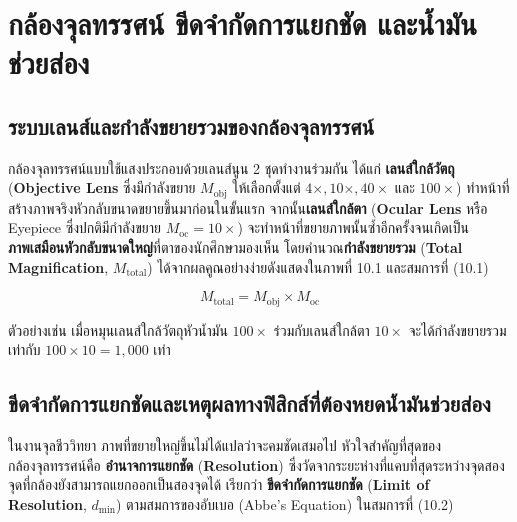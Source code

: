 \clearpage

\chapter{กล้องจุลทรรศน์ ขีดจำกัดการแยกชัด และน้ำมันช่วยส่อง}

\section{ระบบเลนส์และกำลังขยายรวมของกล้องจุลทรรศน์}


กล้องจุลทรรศน์แบบใช้แสงประกอบด้วยเลนส์นูน 2 ชุดทำงานร่วมกัน ได้แก่ \textbf{เลนส์ใกล้วัตถุ} (\textbf{Objective Lens} ซึ่งมีกำลังขยาย $M_{\text{obj}}$ ให้เลือกตั้งแต่ $4\times, 10\times, 40\times$ และ $100\times$) ทำหน้าที่สร้างภาพจริงหัวกลับขนาดขยายขึ้นมาก่อนในขั้นแรก จากนั้น\textbf{เลนส์ใกล้ตา} (\textbf{Ocular Lens} หรือ Eyepiece ซึ่งปกติมีกำลังขยาย $M_{\text{oc}} = 10\times$) จะทำหน้าที่ขยายภาพนั้นซ้ำอีกครั้งจนเกิดเป็น\textbf{ภาพเสมือนหัวกลับขนาดใหญ่}ที่ตาของนักศึกษามองเห็น โดยคำนวณ\textbf{กำลังขยายรวม} (\textbf{Total Magnification}, $M_{\text{total}}$) ได้จากผลคูณอย่างง่ายดังแสดงใน\mbox{ภาพที่} 10.1 และสมการที่ (10.1)

\begin{equation}
    M_{\text{total}} = M_{\text{obj}} \times M_{\text{oc}}
\end{equation}

ตัวอย่างเช่น เมื่อหมุนเลนส์ใกล้วัตถุหัวน้ำมัน $100\times$ ร่วมกับเลนส์ใกล้ตา $10\times$ จะได้กำลังขยายรวมเท่ากับ $100 \times 10 = 1{,}000$ เท่า

\section{ขีดจำกัดการแยกชัดและเหตุผลทางฟิสิกส์ที่ต้องหยดน้ำมันช่วยส่อง}


ในงานจุลชีววิทยา ภาพที่ขยายใหญ่ขึ้นไม่ได้แปลว่าจะคมชัดเสมอไป หัวใจสำคัญที่สุดของกล้องจุลทรรศน์คือ \textbf{อำนาจการแยกชัด} (\textbf{Resolution}) ซึ่งวัดจากระยะห่างที่แคบที่สุดระหว่างจุดสองจุดที่กล้องยังสามารถแยกออกเป็นสองจุดได้ เรียกว่า \textbf{ขีดจำกัดการแยกชัด} (\textbf{Limit of Resolution}, $d_{\min}$) ตามสมการของอับเบอ (Abbe's Equation) ในสมการที่ (10.2)

